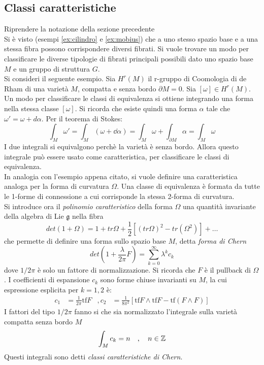 \subsection{Classi caratteristiche}
Riprendere la notazione della sezione precedente \\

Si è visto (esempi \ref{ex:cilindro} e \ref{ex:mobius}) che a uno stesso spazio
base e a una stessa fibra possono corrispondere diversi fibrati. Si vuole trovare
un modo per classificare le diverse tipologie di fibrati principali possibili dato uno
spazio base $M$ e un gruppo di struttura $G$.\\

Si consideri il seguente esempio. Sia $H^r(M)$ il r-gruppo di Coomologia di de Rham
di una varietà $M$, compatta e senza bordo $\partial M = 0$.
Sia $[\omega] \in H^r(M)$.\\
Un modo per classificare le classi di equivalenza si ottiene integrando una forma
nella stessa classe $[\omega]$. Si ricorda che esiste quindi una forma $\alpha$
tale che $\omega' = \omega + d\alpha$. Per il teorema di Stokes:
$$ \int_M \omega' = \int_M (\omega + \dd \alpha) = \int_M \omega
   + \int_{\partial M} \alpha = \int_M \omega $$
I due integrali si equivalgono perchè la varietà è senza bordo. Allora questo integrale
può essere usato come caratteristica, per classificare le classi di equivalenza.\\

In analogia con l'esempio appena citato, si vuole definire una caratteristica
analoga per la forma di curvatura $\Omega$. Una classe di equivalenza è formata
da tutte le 1-forme di connessione a cui corrisponde la stessa 2-forma di curvatura.\\
Si introduce ora il \emph{polinomio caratteristico} della forma $\Omega$ una quantità
invariante della algebra di Lie $\mathfrak{g}$ nella fibra
$$ det(1+\Omega) = 1 + tr\Omega + \frac{1}{2}[(tr\Omega)^2 - tr(\Omega^2)] + \dots $$
che permette di definire una forma sullo spazio base $M$, detta \emph{forma di Chern}
$$ det\left(1 + \frac{\lambda}{2\pi}F\right) = \sum_{k=0}^\infty \lambda^k c_k $$
dove $1/2\pi$ è solo un fattore di normalizzazione. Si ricorda che $F$ è il pullback
di $\Omega$. I coefficienti di espansione $c_k$ sono forme chiuse invarianti su $M$,
la cui espressione esplicita per $k = 1,2$ è:
\begin{equation}
   \begin{aligned}
      c_1 &= \frac{1}{2\pi} \mathrm{tf} F &,
      c_2 & = \frac{1}{8\pi^2}[ \mathrm{tf} F \wedge \mathrm{tf} F
           - \mathrm{tf} (F \wedge F)]
   \end{aligned}
\end{equation}
I fattori del tipo $1/2\pi$ fanno si che sia normalizzato l'integrale sulla varietà
compatta senza bordo $M$
\begin{equation}
   \int_M c_k = n \quad , \quad n \in \mathbb{Z}
\end{equation}
Questi integrali sono detti \emph{classi caratteristiche di Chern}.\\

